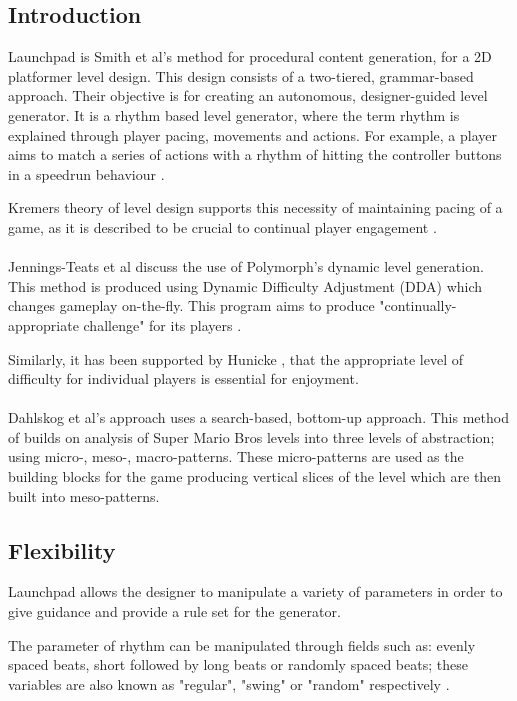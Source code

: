 \documentclass{scrartcl}
\begin{document}
\subsection{Introduction}

Launchpad is Smith et al's \cite{Smith2011} method for procedural content generation, for a 2D platformer level design. This design consists of a two-tiered, grammar-based approach. Their objective is for creating an autonomous, designer-guided level generator. It is a rhythm based level generator, where the term rhythm is explained through player pacing, movements and actions. For example, a player aims to match a series of actions with a rhythm of hitting the controller buttons in a speedrun behaviour \cite{Smith2011}.

Kremers theory of level design supports this necessity of maintaining pacing of a game, as it is described to be crucial to continual player engagement \cite[pp. 246]{Kremers2009}. \\ \\
Jennings-Teats et al \cite{Jennings2010:Model} discuss the use of Polymorph's dynamic level generation. This method is produced using Dynamic Difficulty Adjustment (DDA) which changes gameplay on-the-fly. This program aims to produce "continually-appropriate challenge" for its players \cite{Jennings2010:DDA}.

Similarly, it has been supported by Hunicke \cite{Hunicke2005}, that the appropriate level of difficulty for individual players is essential for enjoyment. \\ \\
Dahlskog et al's \cite{Dahlskog2014} approach uses a search-based, bottom-up approach. This method of builds on analysis of Super Mario Bros \cite{Dahlskog2012} levels into three levels of abstraction; using micro-, meso-, macro-patterns. These micro-patterns are used as the building blocks for the game producing vertical slices of the level which are then built into meso-patterns.

\subsection{Flexibility}

Launchpad allows the designer to manipulate a variety of parameters in order to give guidance and provide a rule set for the generator.

The parameter of rhythm can be manipulated through fields such as: evenly spaced beats, short followed by long beats or randomly spaced beats; these variables are also known as "regular", "swing" or "random" respectively \cite[pp. 7]{Smith2011}. 
\end{document}
